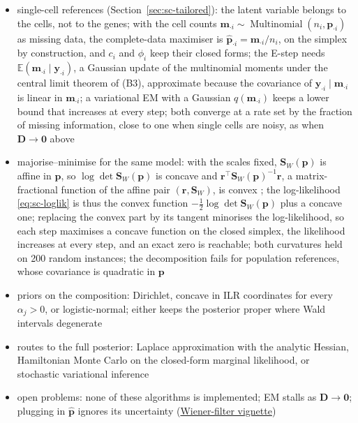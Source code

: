 \documentclass[pdflatex, sn-nature]{sn-jnl}
\theoremstyle{thmstyleone}%
\theoremstyle{thmstyletwo}%
\theoremstyle{thmstylethree}%
\newcommand{\vignette}[2]{\href{https://bastienchassagnol.github.io/DeCovarT/articles/#1}{#2}}
\begin{document}
\begin{itemize}
        increase the marginal likelihood, and a mean-field variant that keeps the sparse precisions
  \item single-cell references (Section~\ref{sec:sc-tailored}): the latent variable belongs to the cells, not to the genes;
        with the cell counts \(\boldsymbol{m}_{\cdot i}\sim\operatorname{Multinomial}(n_{i},\boldsymbol{p}_{\cdot i})\) as missing data, the
        complete-data maximiser is \(\hat{\boldsymbol{p}}_{\cdot i}=\boldsymbol{m}_{\cdot i}/n_{i}\), on the simplex by construction, and
        \(c_{i}\) and \(\phi_{i}\) keep their closed forms; the E-step needs \(\mathbb{E}(\boldsymbol{m}_{\cdot i}\mid\boldsymbol{y}_{\cdot i})\),
        a Gaussian update of the multinomial moments under the central limit theorem of (B3), approximate because the
        covariance of \(\boldsymbol{y}_{\cdot i}\mid\boldsymbol{m}_{\cdot i}\) is linear in \(\boldsymbol{m}_{\cdot i}\); a variational EM with a
        Gaussian \(q(\boldsymbol{m}_{\cdot i})\) keeps a lower bound that increases at every step; both converge at a rate set
        by the fraction of missing information, close to one when single cells are noisy, as when
        \(\boldsymbol{D}\to\boldsymbol{0}\) above
  \item majorise--minimise for the same model: with the scales fixed, \(\boldsymbol{S}_{W}(\boldsymbol{p})\) is affine in \(\boldsymbol{p}\), so
        \(\log\det\boldsymbol{S}_{W}(\boldsymbol{p})\) is concave \cite[p.~74]{boydConvexOptimization2004} and
        \(\boldsymbol{r}^{\top}\boldsymbol{S}_{W}(\boldsymbol{p})^{-1}\boldsymbol{r}\), a matrix-fractional function of the affine pair
        \((\boldsymbol{r},\boldsymbol{S}_{W})\), is convex \cite[Example~3.4, p.~76]{boydConvexOptimization2004}; the log-likelihood
        \eqref{eq:sc-loglik} is thus the convex function \(-\tfrac12\log\det\boldsymbol{S}_{W}(\boldsymbol{p})\) plus a concave one;
        replacing the convex part by its tangent minorises the log-likelihood, so each step maximises a concave function
        on the closed simplex, the likelihood increases at every step, and an exact zero is reachable; both curvatures
        held on 200 random instances; the decomposition fails for population references, whose covariance is quadratic in
        \(\boldsymbol{p}\)
  \item priors on the composition: Dirichlet, concave in ILR coordinates for every \(\alpha_{j}>0\), or
        logistic-normal; either keeps the posterior proper where Wald intervals degenerate
  \item routes to the full posterior: Laplace approximation with the analytic Hessian, Hamiltonian Monte Carlo
        on the closed-form marginal likelihood, or stochastic variational inference
  \item open problems: none of these algorithms is implemented; EM stalls as \(\boldsymbol{D}\to\boldsymbol{0}\);
        plugging in \(\hat{\boldsymbol{p}}\) ignores its uncertainty
        (\vignette{05-2-bayesian-wiener.html}{Wiener-filter vignette})
\end{itemize}
\end{document}
